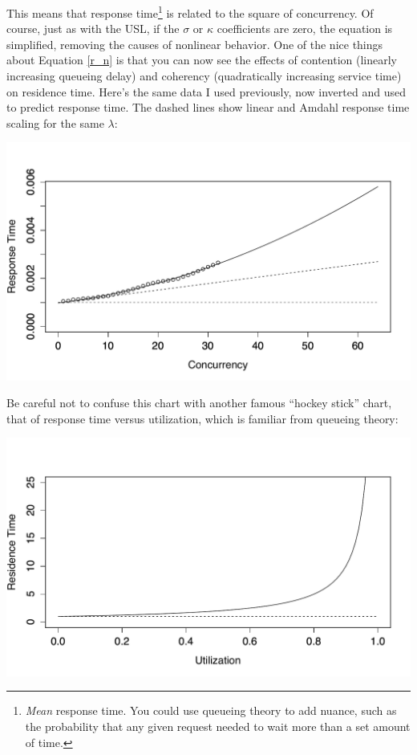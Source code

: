 \documentclass{vivid_layout}
\begin{document}
This means that response time\footnote{{\itshape Mean} response time. You could
use queueing theory to add nuance, such as the probability that any given
request needed to wait more than a set amount of time.} is related to the square
of concurrency.  Of course, just as with the USL, if the $\sigma$ or $\kappa$
coefficients are zero, the equation is simplified, removing the causes of
nonlinear behavior. One of the nice things about Equation \ref{r_n} is that you
can now see the effects of contention (linearly increasing queueing delay) and
coherency (quadratically increasing service time) on residence time.  Here's the
same data I used previously, now inverted and used to predict response time. The
dashed lines show linear and Amdahl response time scaling for the same
$\lambda$:
\begin{center}
\includegraphics[width=.85\linewidth]{scalability/cisco-tput}
\end{center}

Be careful not to confuse this chart with another famous ``hockey stick'' chart,
that of response time versus utilization, which is familiar from queueing
theory:
\begin{center}
\includegraphics[width=.85\linewidth]{scalability/hockey}
\end{center}
\end{document}
